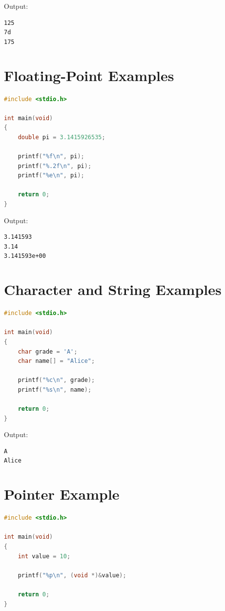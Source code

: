 \documentclass[12pt,openany]{book}
\begin{document}
Output:

\begin{lstlisting}
125
7d
175
\end{lstlisting}

\section{Floating-Point Examples}

\begin{lstlisting}[language=C]
#include <stdio.h>

int main(void)
{
    double pi = 3.1415926535;

    printf("%f\n", pi);
    printf("%.2f\n", pi);
    printf("%e\n", pi);

    return 0;
}
\end{lstlisting}

Output:

\begin{lstlisting}
3.141593
3.14
3.141593e+00
\end{lstlisting}

\section{Character and String Examples}

\begin{lstlisting}[language=C]
#include <stdio.h>

int main(void)
{
    char grade = 'A';
    char name[] = "Alice";

    printf("%c\n", grade);
    printf("%s\n", name);

    return 0;
}
\end{lstlisting}

Output:

\begin{lstlisting}
A
Alice
\end{lstlisting}

\section{Pointer Example}

\begin{lstlisting}[language=C]
#include <stdio.h>

int main(void)
{
    int value = 10;

    printf("%p\n", (void *)&value);

    return 0;
}
\end{lstlisting}
\end{document}
